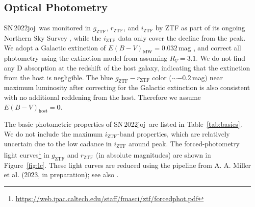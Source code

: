 \documentclass[twocolumn]{aastex631}
\newcommand{\sn}{SN\,2022joj}
\begin{document}
\begin{CJK*}{UTF8}{gbsn}
\subsection{Optical Photometry}
\sn\ was monitored in $g_\mathrm{ZTF}$, $r_\mathrm{ZTF}$, and $i_\mathrm{ZTF}$ by ZTF as part of its ongoing Northern Sky Survey \citep{Bellm_ZTF_2019b}, while the $i_\mathrm{ZTF}$ data only cover the decline from the peak. We adopt a Galactic extinction of $E(B-V)_\mathrm{MW}=0.032$\,mag \citep{Schlafly2011}, and correct all photometry using the extinction model from \citet{Fitzpatrick1999} assuming $R_V=3.1$. We do not find any  D absorption at the redshift of the host galaxy, indicating that the extinction from the host is negligible. The blue $g_\mathrm{ZTF}-r_\mathrm{ZTF}$ color ($\sim$$-0.2$\,mag) near maximum luminosity after correcting for the Galactic extinction is also consistent with no additional reddening from the host. Therefore we assume $E(B-V)_\mathrm{host}=0$.

The basic photometric properties of \sn\ are listed in Table~\ref{tab:basics}. We do not include the maximum $i_\mathrm{ZTF}$-band properties, which are relatively uncertain due to the low cadance in $i_\mathrm{ZTF}$ around peak. 
The forced-photometry light curves\footnote{\url{https://web.ipac.caltech.edu/staff/fmasci/ztf/forcedphot.pdf}} in $g_\mathrm{ZTF}$ and $r_\mathrm{ZTF}$ (in absolute magnitudes) are shown in Figure~\ref{fig:lc}. These light curves are reduced using the pipeline from A. A. Miller et al. (2023, in preparation); see also \citet{Yao_2019}.




\end{CJK*}
\end{document}
